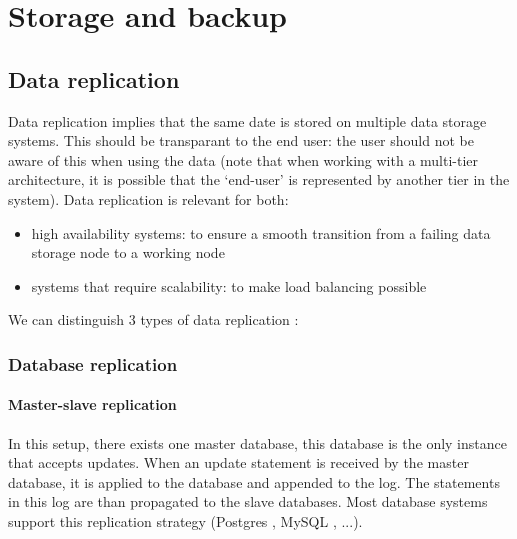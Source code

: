 \documentclass[12pt]{report}
\begin{document}
\section{Storage and backup}

\subsection{Data replication}
Data replication implies that the same date is stored on multiple
data storage systems. This should be transparant to the end user: the
user should not be aware of this when using the data (note that when
working with a multi-tier architecture, it is possible that the
`end-user'  is represented by another tier in the system).
Data replication is relevant for both:
\begin{itemize}
\item high availability systems: to ensure a smooth transition from a
  failing data storage node to a working node
\item systems that require scalability: to make load balancing possible
\end{itemize}
We can distinguish 3 types of data replication
\cite{datareplication:2013} :

\subsubsection{Database replication}

\paragraph*{Master-slave replication}
In this setup, there exists one master database, this database is the only instance
that accepts updates. When an update statement is received by the
master database, it is applied to the database and appended to the log. The statements
in this log are than propagated to the slave databases.
Most database systems support this replication strategy (Postgres \cite{postgres_db:2013},
MySQL \cite{mysql_db:2013}, ...).
\end{document}
